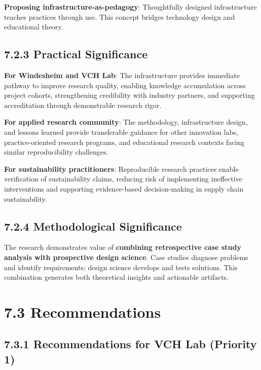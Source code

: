 \documentclass[
  oneside,
  open=any]{scrbook}
\begin{document}
\textbf{Proposing infrastructure-as-pedagogy}: Thoughtfully designed
infrastructure teaches practices through use. This concept bridges
technology design and educational theory.

\subsection{7.2.3 Practical
Significance}\label{practical-significance-1}

\textbf{For Windesheim and VCH Lab}: The infrastructure provides
immediate pathway to improve research quality, enabling knowledge
accumulation across project cohorts, strengthening credibility with
industry partners, and supporting accreditation through demonstrable
research rigor.

\textbf{For applied research community}: The methodology, infrastructure
design, and lessons learned provide transferable guidance for other
innovation labs, practice-oriented research programs, and educational
research contexts facing similar reproducibility challenges.

\textbf{For sustainability practitioners}: Reproducible research
practices enable verification of sustainability claims, reducing risk of
implementing ineffective interventions and supporting evidence-based
decision-making in supply chain sustainability.

\subsection{7.2.4 Methodological
Significance}\label{methodological-significance}

The research demonstrates value of \textbf{combining retrospective case
study analysis with prospective design science}. Case studies diagnose
problems and identify requirements; design science develops and tests
solutions. This combination generates both theoretical insights and
actionable artifacts.

\section{7.3 Recommendations}\label{recommendations}

\subsection{7.3.1 Recommendations for VCH Lab (Priority
1)}\label{recommendations-for-vch-lab-priority-1}
\end{document}
